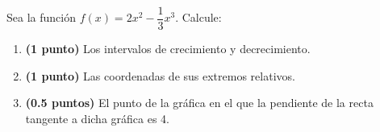 
Sea la función $f(x)=2x^2-\dfrac{1}{3}x^3$. Calcule:
\begin{enumerate}[label=\alph*)]
\item \textbf{(1 punto)} Los intervalos de crecimiento y decrecimiento.
\item \textbf{(1 punto)} Las coordenadas de sus extremos relativos.
\item \textbf{(0.5 puntos)} El punto de la gráfica en el que la pendiente de la recta tangente a dicha gráfica es 4.
\end{enumerate}
